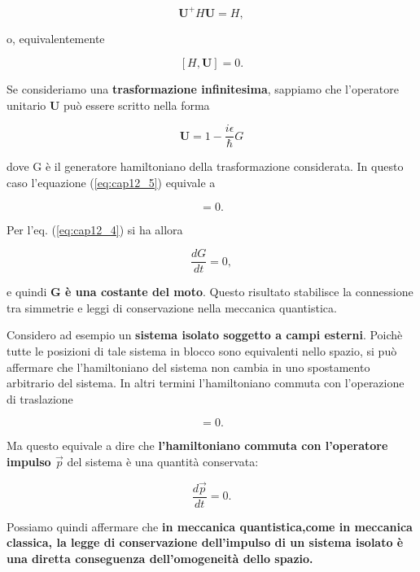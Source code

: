 \begin{equation}
\textbf{U}^+H\textbf{U}= H,
\end{equation}

o, equivalentemente 

\begin{equation}\label{eq:cap12_5}
[H,\textbf{U}]=0.
\end{equation}

Se consideriamo una \textbf{trasformazione infinitesima}, sappiamo che l'operatore unitario $\textbf{U}$ può essere scritto nella forma 

\begin{equation}
\textbf{U}= 1- \frac{i\epsilon}{\hbar}G
\end{equation}

dove G è il generatore hamiltoniano della trasformazione considerata. In questo caso l'equazione (\ref{eq:cap12_5}) equivale a 

\begin{equation} 
[H,G]=0.
\end{equation}

Per l'eq. (\ref{eq:cap12_4}) si ha allora

\begin{equation}
\frac{dG}{dt}=0,
\end{equation}

e quindi \textbf{G è una costante del moto}. Questo risultato stabilisce la connessione tra simmetrie e leggi di conservazione nella meccanica quantistica.

Considero ad esempio un \textbf{sistema isolato soggetto a campi esterni}. Poichè tutte le posizioni di tale sistema in blocco sono equivalenti nello spazio, si può affermare che l'hamiltoniano del sistema non cambia in uno spostamento arbitrario del sistema. In altri termini l'hamiltoniano commuta con l'operazione di traslazione

\begin{equation}
[H,T (d\vec{x}^{'})]=0.
\end{equation}

Ma questo equivale a dire che \textbf{l'hamiltoniano commuta con l'operatore impulso $\vec{p}$} del sistema è una quantità conservata:

\begin{equation}
\frac{d\vec{p}}{dt}=0.
\end{equation}

Possiamo quindi affermare che \textbf{in meccanica quantistica,come in meccanica classica, la legge di conservazione dell'impulso di un sistema isolato è una diretta conseguenza dell'omogeneità dello spazio.}

